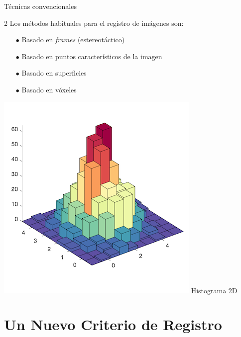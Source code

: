 \documentclass[14pt,xcolor={rgb}]{beamer}
\begin{document}
\begin{frame}{T\'ecnicas convencionales}
\small
\begin{multicols} {2}
Los m\'etodos habituales para el registro de im\'agenes son:
\begin{enumerate}
	\item[$\bullet$] Basado en \textit{frames} (estereot\'actico)
	\item[$\bullet$] Basado en puntos caracter\'isticos de la imagen
	\item[$\bullet$] Basado en superficies
	\item[$\bullet$] Basado en v\'oxeles
\end{enumerate}
\begin{center}
	\includegraphics[scale=0.5]{Images/hist2d.png}
	Histograma 2D
\end{center}
\end{multicols}
\end{frame}

\section{Un Nuevo Criterio de Registro}
\end{document}
